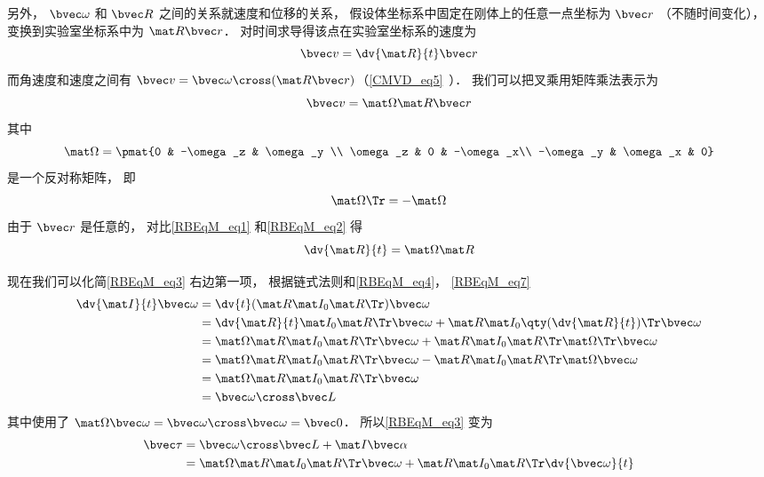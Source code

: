 另外， $\bvec \omega$ 和 $\bvec R$ 之间的关系就速度和位移的关系， 假设体坐标系中固定在刚体上的任意一点坐标为 $\bvec r$ （不随时间变化）， 变换到实验室坐标系中为 $\mat R \bvec r$． 对时间求导得该点在实验室坐标系的速度为
\begin{equation}\label{RBEqM_eq1}
\bvec v = \dv{\mat R}{t} \bvec r
\end{equation}
而角速度和速度之间有 $\bvec v = \bvec \omega \cross (\mat R \bvec r)$（\autoref{CMVD_eq5}~）． 我们可以把叉乘用矩阵乘法表示为 %
\begin{equation}\label{RBEqM_eq2}
\bvec v = \mat\Omega \mat R \bvec r
\end{equation}
其中
\begin{equation}
\mat\Omega = \pmat{0 & -\omega_z & \omega_y \\ \omega_z & 0 & -\omega_x\\ -\omega_y & \omega_x & 0}
\end{equation}
是一个反对称矩阵， 即
\begin{equation}\label{RBEqM_eq7}
\mat \Omega\Tr = -\mat \Omega
\end{equation}
由于 $\bvec r$ 是任意的， 对比\autoref{RBEqM_eq1} 和\autoref{RBEqM_eq2} 得
\begin{equation}\label{RBEqM_eq4}
\dv{\mat R}{t} = \mat\Omega \mat R
\end{equation}

现在我们可以化简\autoref{RBEqM_eq3} 右边第一项， 根据链式法则和\autoref{RBEqM_eq4}， \autoref{RBEqM_eq7}
\begin{equation}
\begin{aligned}
\dv{\mat I}{t}\bvec\omega &= \dv{t}(\mat R \mat I_0 \mat R\Tr)\bvec\omega\\
&= \dv{\mat R}{t} \mat I_0 \mat R\Tr \bvec\omega + \mat R \mat I_0 \qty(\dv{\mat R}{t})\Tr \bvec\omega\\
&= \mat \Omega \mat R \mat I_0 \mat R\Tr \bvec\omega + \mat R \mat I_0 \mat R\Tr \mat \Omega\Tr \bvec\omega\\
&= \mat \Omega \mat R \mat I_0 \mat R\Tr \bvec\omega - \mat R \mat I_0 \mat R\Tr \mat \Omega \bvec\omega\\
&= \mat \Omega \mat R \mat I_0 \mat R\Tr \bvec\omega\\
&= \bvec \omega \cross \bvec L
\end{aligned}
\end{equation}
其中使用了 $\mat \Omega \bvec\omega = \bvec\omega \cross \bvec\omega = \bvec 0$． 所以\autoref{RBEqM_eq3} 变为
\begin{equation}
\begin{aligned}
\bvec\tau &= \bvec\omega \cross \bvec L + \mat I \bvec\alpha\\
&= \mat \Omega \mat R \mat I_0 \mat R\Tr \bvec\omega + \mat R \mat I_0 \mat R\Tr \dv{\bvec\omega}{t}
\end{aligned}
\end{equation}

